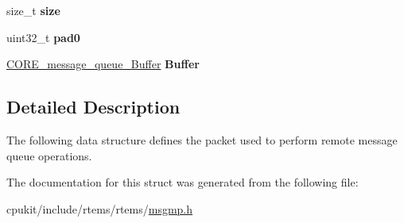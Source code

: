 \begin{DoxyCompactItemize}
\mbox{\label{structMessage__queue__MP__Packet_a49c8e9fc7439e4ee0cf9f2af6e8e2c3c}} 
size\+\_\+t {\bfseries size}
\item 
\mbox{\label{structMessage__queue__MP__Packet_a1340127a1152ff9722b67ef70e790c02}} 
uint32\+\_\+t {\bfseries pad0}
\item 
\mbox{\label{structMessage__queue__MP__Packet_a36dd02898319f2ec7a1fdb3086661744}} 
\mbox{\hyperlink{structCORE__message__queue__Buffer}{C\+O\+R\+E\+\_\+message\+\_\+queue\+\_\+\+Buffer}} {\bfseries Buffer}
\end{DoxyCompactItemize}


\subsection{Detailed Description}
The following data structure defines the packet used to perform remote message queue operations. 

The documentation for this struct was generated from the following file\+:\begin{DoxyCompactItemize}
\item 
cpukit/include/rtems/rtems/\mbox{\hyperlink{msgmp_8h}{msgmp.\+h}}\end{DoxyCompactItemize}
